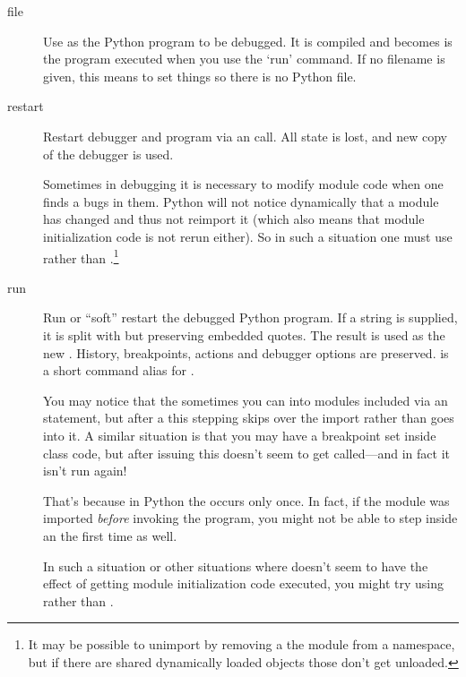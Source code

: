 \begin{description}

\item[file \label{command:file}]

Use  as the Python program to be debugged.
It is compiled and becomes is the program executed when you use the `run'
command.  If no filename is given, this means to set things so there
is no Python file.

\item[restart ]\label{command:restart}

Restart debugger and program via an  call. All state
is lost, and new copy of the debugger is used.

Sometimes in debugging it is necessary to modify module code when one
finds a bugs in them. Python will not notice dynamically that a module
has changed and thus not reimport it (which also means that module
initialization code is not rerun either). So in such a situation one
must use  rather than .\footnote{It may be
possible to unimport by removing a the module from a namespace, but if
there are shared dynamically loaded objects those don't get unloaded.}

\item[run ]\label{command:run}

Run or ``soft'' restart the debugged Python program. If a string is
supplied, it is split with  but preserving embedded
quotes. The result is used as the new .  History,
breakpoints, actions and debugger options are preserved.   is
a short command alias for .

You may notice that the sometimes you can  into modules
included via an  statement, but after a  this
stepping skips over the import rather than goes into it. A similar
situation is that you may have a breakpoint set inside class
 code, but after issuing  this doesn't seem
to get called---and in fact it isn't run again!

That's because in Python the  occurs only once. In fact,
if the module was imported \emph{before\/} invoking the program, you
might not be able to step inside an  the first time as
well.

In such a situation or other situations where  doesn't seem
to have the effect of getting module initialization code executed,
you might try using  rather than .

\end{description}

